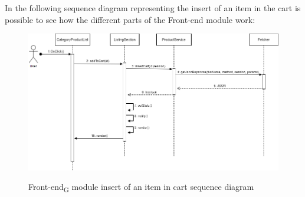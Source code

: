 \newpage
In the following sequence diagram representing the insert of an item in the cart is possible to see how the different parts of the Front-end module work:
\begin{figure}[H]
\centering
\includegraphics[scale=0.70]{res/Architettura/Frontend/img/sequence_frontend_insertCart}\\
\caption{Front-end\textsubscript{G} module insert of an item in cart sequence diagram}
\end{figure}

